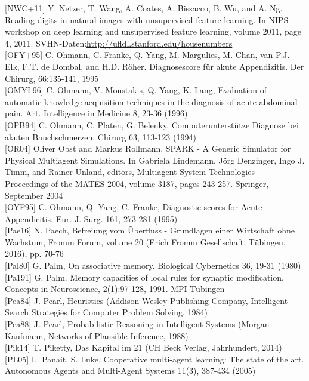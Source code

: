 \documentclass[10pt]{article}
\begin{document}
[NWC+11] Y. Netzer, T. Wang, A. Coates, A. Bissacco, B. Wu, and A. Ng. Reading digits in natural images with unsupervised feature learning. In NIPS workshop on deep learning and unsupervised feature learning, volume 2011, page 4, 2011. SVHN-Daten:\href{http://ufldl.stanford.edu/housenumbers}{http://ufldl.stanford.edu/housenumbers}\\[0pt]
[OFY+95] C. Ohmann, C. Franke, Q. Yang, M. Margulies, M. Chan, van P.J. Elk, F.T. de Dombal, and H.D. Röher. Diagnosescore für akute Appendizitis. Der Chirurg, 66:135-141, 1995\\[0pt]
[OMYL96] C. Ohmann, V. Moustakis, Q. Yang, K. Lang, Evaluation of automatic knowledge acquisition techniques in the diagnosis of acute abdominal pain. Art. Intelligence in Medicine 8, 23-36 (1996)\\[0pt]
[OPB94] C. Ohmann, C. Platen, G. Belenky, Computerunterstütze Diagnose bei akuten Bauchschmerzen. Chirurg 63, 113-123 (1994)\\[0pt]
[OR04] Oliver Obst and Markus Rollmann. SPARK - A Generic Simulator for Physical Multiagent Simulations. In Gabriela Lindemann, Jörg Denzinger, Ingo J. Timm, and Rainer Unland, editors, Multiagent System Technologies - Proceedings of the MATES 2004, volume 3187, pages 243-257. Springer, September 2004\\[0pt]
[OYF95] C. Ohmann, Q. Yang, C. Franke, Diagnostic scores for Acute Appendicitis. Eur. J. Surg. 161, 273-281 (1995)\\[0pt]
[Pae16] N. Paech, Befreiung vom Überfluss - Grundlagen einer Wirtschaft ohne Wachstum, Fromm Forum, volume 20 (Erich Fromm Gesellschaft, Tübingen, 2016), pp. 70-76\\[0pt]
[Pal80] G. Palm, On associative memory. Biological Cybernetics 36, 19-31 (1980)\\[0pt]
[Pa191] G. Palm. Memory capacities of local rules for synaptic modification. Concepts in Neuroscience, 2(1):97-128, 1991. MPI Tübingen\\[0pt]
[Pea84] J. Pearl, Heuristics (Addison-Wesley Publishing Company, Intelligent Search Strategies for Computer Problem Solving, 1984)\\[0pt]
[Pea88] J. Pearl, Probabilistic Reasoning in Intelligent Systems (Morgan Kaufmann, Networks of Plausible Inference, 1988)\\[0pt]
[Pik14] T. Piketty, Das Kapital im 21 (CH Beck Verlag, Jahrhundert, 2014)\\[0pt]
[PL05] L. Panait, S. Luke, Cooperative multi-agent learning: The state of the art. Autonomous Agents and Multi-Agent Systems 11(3), 387-434 (2005)\\[0pt]
\end{document}
